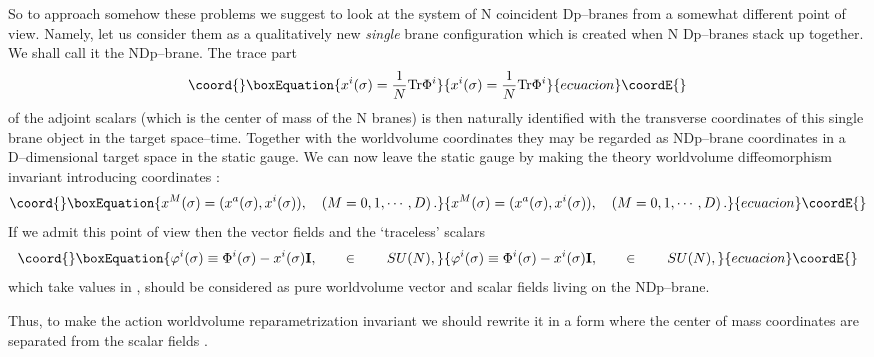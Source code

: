 \documentclass[a4paper,12pt]{article}
\begin{document}
So to approach somehow these problems we suggest to look at the system
of N coincident Dp--branes from a somewhat different
point of view. Namely, let us consider them as a
qualitatively new
{\it single} brane configuration which is created when N
Dp--branes stack up together. We shall call it the NDp--brane. The
trace part
\begin{equation}\coord{}\boxEquation{\label{trace}
x^i(\sigma)={1\over{N}}{\rm Tr}\Phi^i
}{x^i(\sigma)={1\over{N}}{\rm Tr}\Phi^i
}{ecuacion}\coordE{}\end{equation}
 of the \coordHE{} adjoint scalars \coordHE{}
(which is the center of mass of the N branes) is then naturally
identified with the transverse coordinates of this single brane
object in the target space--time. Together with the worldvolume
coordinates \coordHE{} they may be regarded as NDp--brane
coordinates \coordHE{}  \coordHE{} in a D--dimensional target space in the static
gauge. We can now leave the static gauge by making the theory
worldvolume diffeomorphism invariant introducing \coordHE{} coordinates
\coordHE{}:
\begin{equation}\coord{}\boxEquation{\label{3}
x^M(\sigma)=(x^a(\sigma), x^i(\sigma)),
\quad (M=0,1,\cdots, D)\,.
}{x^M(\sigma)=(x^a(\sigma), x^i(\sigma)),
\quad (M=0,1,\cdots, D)\,.
}{ecuacion}\coordE{}\end{equation}
If we admit this point of view then the \coordHE{} vector fields
\coordHE{} and the `traceless' scalars
\begin{equation}\coord{}\boxEquation{\label{4}
\varphi^i(\sigma)\equiv \Phi^i(\sigma)-x^i(\sigma) {\bf I}, \qquad \in
\qquad SU(N),
}{\varphi^i(\sigma)\equiv \Phi^i(\sigma)-x^i(\sigma) {\bf I}, \qquad \in
\qquad SU(N),
}{ecuacion}\coordE{}\end{equation}
which take values in \coordHE{}, should
be considered as pure worldvolume vector and scalar fields living
on the NDp--brane.

Thus, to make the action  worldvolume reparametrization
invariant we should rewrite it in a form where the center of mass
coordinates \coordHE{}  are separated from the \coordHE{} scalar
fields \coordHE{} .
\end{document}
